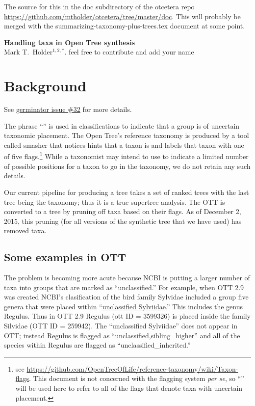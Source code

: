 \documentclass[11pt]{article}
\begin{document}
The source for this in the doc subdirectory of the otcetera
    repo \url{https://github.com/mtholder/otcetera/tree/master/doc}.
This will probably be merged with the summarizing-taxonomy-plus-trees.tex document at
    some point.
\begin{center}
    {\bf Handling \insed taxa in Open Tree synthesis} \\
{Mark T.~Holder$^{1,2,\ast}$. feel free to contribute and add your name}
\end{center}
\tableofcontents
\section{Background}
See \href{https://github.com/OpenTreeOfLife/germinator/issues/32}{germinator issue \#32} for more details.

The phrase ``\insed'' is used in classifications to indicate that a group is of uncertain
    taxonomic placement.
The Open Tree's reference taxonomy is produced by a tool called smasher that notices hints that a taxon
    is \insed and labels that taxon with one of five flags.\footnote{see \url{https://github.com/OpenTreeOfLife/reference-taxonomy/wiki/Taxon-flags}. This document is not
    concerned with the flagging system {\em per se}, so ``\insed'' will be used here to
    refer to all of the flags that denote taxa with uncertain placement.}
While a taxonomist may intend to use \insed to indicate a limited number of possible positions for 
    a taxon to go in the taxonomy, we do not retain any such details.


Our current pipeline for producing a tree takes a set of ranked trees with the last tree
    being the taxonomy; thus it is a true supertree analysis.
The OTT is converted to a tree by pruning off taxa based on their flags.
As of December 2, 2015, this pruning (for all versions of the synthetic tree that we have used)
    has removed \insed taxa.

\subsection{Some examples in OTT}
The problem is becoming more acute because NCBI is putting a larger number of taxa into groups that
    are marked as ``unclassified.''
For example, when OTT 2.9 was created NCBI's clasification of the bird family Sylvidae included 
    a group five genera that were placed within ``\href{http://www.ncbi.nlm.nih.gov/Taxonomy/Browser/wwwtax.cgi?mode=Undef&id=36270&lvl=3&lin=f&keep=1&srchmode=1&unlock}{unclassified Sylviidae.}''
This includes the genus {Regulus}.
Thus in OTT 2.9 Regulus (ott ID = 3599326) is placed inside the family Silvidae (OTT ID = 259942).
The ``unclassified Sylviidae'' does not appear in OTT; instead Regulus is flagged as ``unclassified,sibling\_higher''
and all of the species within Regulus are flagged as ``unclassified\_inherited.''
\end{document}
